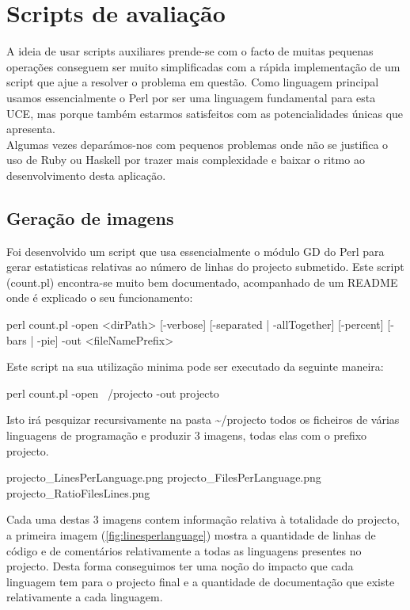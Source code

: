 \chapter{Scripts de avaliação}
\minitoc

A ideia de usar scripts auxiliares prende-se com o facto de muitas pequenas operações conseguem ser muito simplificadas com a rápida implementação
de um script que ajue a resolver o problema em questão. Como linguagem principal usamos essencialmente o \textrm{Perl} por ser uma linguagem fundamental para esta \textrm{UCE},
mas porque também estarmos satisfeitos com as potencialidades únicas que apresenta.\\
Algumas vezes deparámos-nos com pequenos problemas onde não se justifica o uso de \textrm{Ruby} ou \textrm{Haskell} por trazer mais complexidade e baixar o ritmo ao
desenvolvimento desta aplicação.

\section{Geração de imagens}
Foi desenvolvido um script que usa essencialmente o módulo \textrm{GD} do \textrm{Perl} para gerar estatisticas relativas ao número de linhas do projecto submetido.
Este script (count.pl) encontra-se muito bem documentado, acompanhado de um \textrm{README} onde é explicado o seu funcionamento:

\begin{code_files}
perl count.pl -open <dirPath> [-verbose] [-separated | -allTogether]
    [-percent] [-bars | -pie] -out <fileNamePrefix>
\end{code_files}

Este script na sua utilização minima pode ser executado da seguinte maneira:
\begin{code_files}
perl count.pl -open ~/projecto -out projecto
\end{code_files}

Isto irá pesquizar recursivamente na pasta \textrm{\textasciitilde{}/projecto} todos os ficheiros de várias linguagens de programação e produzir $3$ imagens, todas elas com o
prefixo \textrm{projecto}.

\begin{code_files}
projecto_LinesPerLanguage.png
projecto_FilesPerLanguage.png
projecto_RatioFilesLines.png
\end{code_files}

Cada uma destas $3$ imagens contem informação relativa à totalidade do projecto, a primeira imagem (\ref{fig:linesperlanguage}) mostra a quantidade de linhas
de código e de comentários relativamente a todas as linguagens presentes no projecto. Desta forma conseguimos ter uma noção do impacto que cada linguagem
tem para o projecto final e a quantidade de documentação que existe relativamente a cada linguagem.

